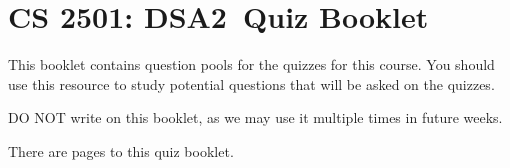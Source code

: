 \documentclass[10pt]{article}
\def\course{CS 2501: DSA2}
\def\exam{Quiz Booklet}
\begin{document}
\section*{\course\ \exam}

\vspace{0.1in}

\vspace{0.35in}

\noindent This booklet contains question pools for the quizzes for this course. You should use this resource to study potential questions that will be asked on the quizzes.

\vspace{12pt}

\noindent DO NOT write on this booklet, as we may use it multiple times in future weeks.

\vspace{12pt}

\noindent There are \pageref{LastPage} pages to this quiz booklet.

\vspace{12pt}



\vspace{0.15in}

\begin{quotation}
\begin{centering}
\end{centering}
\end{quotation}
\end{document}
